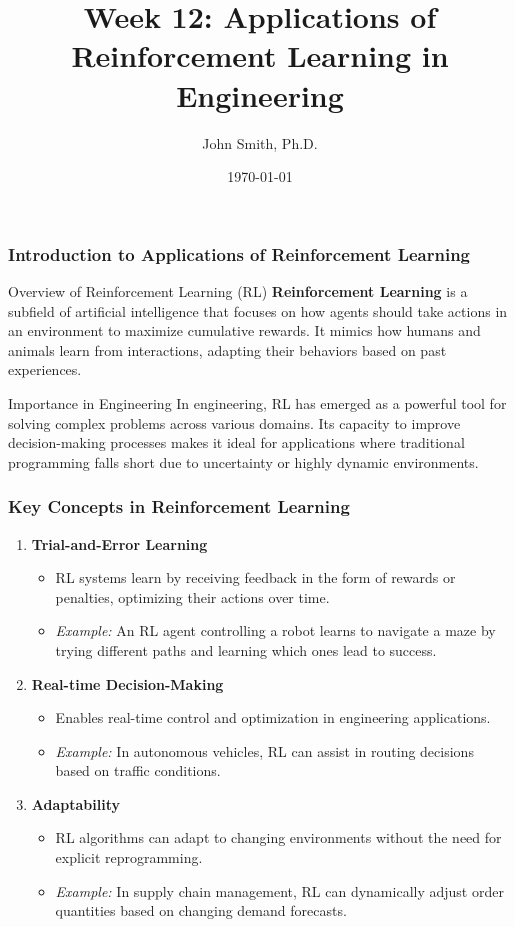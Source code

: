 \documentclass[aspectratio=169]{beamer}
\title[Week 12: RL in Engineering]{Week 12: Applications of Reinforcement Learning in Engineering}
\author[J. Smith]{John Smith, Ph.D.}
\institute[University Name]{
  Department of Computer Science\\
  University Name\\
  \vspace{0.3cm}
  Email: email@university.edu\\
  Website: www.university.edu
}
\date{\today}
\begin{document}
\frame{\titlepage}

\begin{frame}[fragile]
    \frametitle{Introduction to Applications of Reinforcement Learning}
    \begin{block}{Overview of Reinforcement Learning (RL)}
        \textbf{Reinforcement Learning} is a subfield of artificial intelligence that focuses on how agents should take actions in an environment to maximize cumulative rewards. 
        It mimics how humans and animals learn from interactions, adapting their behaviors based on past experiences.
    \end{block}
    
    \begin{block}{Importance in Engineering}
        In engineering, RL has emerged as a powerful tool for solving complex problems across various domains. 
        Its capacity to improve decision-making processes makes it ideal for applications where traditional programming falls short due to uncertainty or highly dynamic environments.
    \end{block}
\end{frame}

\begin{frame}[fragile]
    \frametitle{Key Concepts in Reinforcement Learning}
    \begin{enumerate}
        \item \textbf{Trial-and-Error Learning}
            \begin{itemize}
                \item RL systems learn by receiving feedback in the form of rewards or penalties, optimizing their actions over time.
                \item \textit{Example:} An RL agent controlling a robot learns to navigate a maze by trying different paths and learning which ones lead to success.
            \end{itemize}
        
        \item \textbf{Real-time Decision-Making}
            \begin{itemize}
                \item Enables real-time control and optimization in engineering applications.
                \item \textit{Example:} In autonomous vehicles, RL can assist in routing decisions based on traffic conditions.
            \end{itemize}
        
        \item \textbf{Adaptability}
            \begin{itemize}
                \item RL algorithms can adapt to changing environments without the need for explicit reprogramming.
                \item \textit{Example:} In supply chain management, RL can dynamically adjust order quantities based on changing demand forecasts.
            \end{itemize}
    \end{enumerate}
\end{frame}
\end{document}
